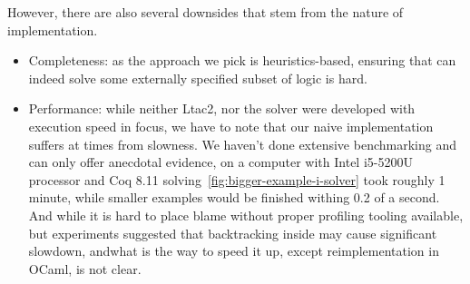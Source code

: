 However, there are also several downsides that stem from the nature of implementation.
\begin{itemize}
\item Completeness: as the approach we pick is heuristics-based, ensuring that  can indeed solve some externally specified subset of logic is hard.
\item Performance: while neither Ltac2, nor the solver were developed with execution speed in focus, we have to note that our naive implementation suffers at times from slowness.
  We haven't done extensive benchmarking and can only offer anecdotal evidence, on a computer with Intel i5-5200U processor and Coq 8.11 solving~\ref{fig:bigger-example-i-solver} took roughly 1 minute, while smaller examples would be finished withing 0.2 of a second.
  And while it is hard to place blame without proper profiling tooling available, but experiments suggested that backtracking inside  may cause significant slowdown, andwhat is the way to speed it up, except reimplementation in OCaml, is not clear.
\end{itemize}

